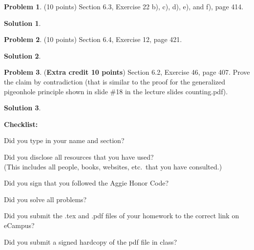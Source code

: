 \documentclass{article}
\theoremstyle{definition}
\newtheorem{problem}{Problem}
\newtheorem*{solution}{Solution}
\newcommand{\checklist}{\noindent\textbf{Checklist:}
\begin{compactitem}[$\Box$] 
\item Did you type in your name and section? 
\item Did you disclose all resources that you have used? \\
(This includes all people, books, websites, etc.\ that you have consulted.)
\item Did you sign that you followed the Aggie Honor Code? 
\item Did you solve all problems? 
\item Did you submit the .tex and .pdf files of your homework to the correct link on eCampus?
\item Did you submit a signed hardcopy of the pdf file in class? 
\end{compactitem}
}
\begin{document}
\begin{problem} (10 points) 
Section 6.3, Exercise 22 b), c), d), e), and f), page 414.
\end{problem}
\begin{solution} 
\end{solution}

\begin{problem} (10 points) 
Section 6.4, Exercise 12, page 421.
\end{problem}
\begin{solution} 
\end{solution}

\begin{problem} (\textbf{Extra credit 10 points})
Section 6.2, Exercise 46, page 407.  Prove the claim by contradiction 
(that is similar to the proof for the generalized pigeonhole principle shown 
in slide \#18 in the lecture slides counting.pdf).
\end{problem}
\begin{solution} 
\end{solution}

\goodbreak
\checklist
\end{document}

